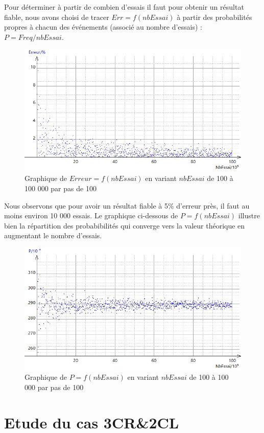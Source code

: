 \documentclass{report}
\begin{document}
\bigskip
\noindent Pour déterminer à partir de combien d'essais il faut pour obtenir un résultat fiable, nous avons choisi de tracer $Err=f(nbEssai)$ à partir des probabilités propres à chacun des événements (associé au nombre d'essais) : $P = Freq/nbEssai$.
\begin{figure}[H]
	\includegraphics[width=\textwidth]{../graphe/Erreur(n).jpg}
	\caption{Graphique de $Erreur=f(nbEssai)$ en variant $nbEssai$ de 100 à 100 000 par pas de 100}
\end{figure}	
\noindent Nous observons que pour avoir un résultat fiable à 5\% d'erreur près, il faut au moins environ 10 000 essais. Le graphique ci-dessous de $P=f(nbEssai)$ illustre bien la répartition des probabibilités qui converge vers la valeur théorique en augmentant le nombre d'essais. 
\begin{figure}[H]
	\includegraphics[width=\textwidth]{../graphe/P(n).jpg}
	\caption{Graphique de $P=f(nbEssai)$ en variant $nbEssai$ de 100 à 100 000 par pas de 100}
\end{figure}	


\section{Etude du cas 3CR\&2CL}
\end{document}
